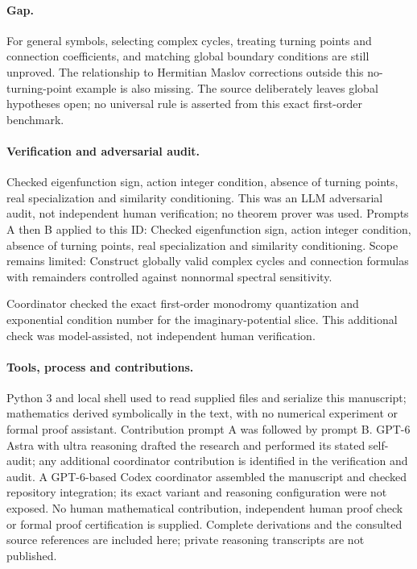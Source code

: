 \documentclass[11pt]{article}
\begin{document}
\paragraph{Gap.}For general symbols, selecting complex cycles, treating turning points and connection coefficients, and matching global boundary conditions are still unproved. The relationship to Hermitian Maslov corrections outside this no-turning-point example is also missing. The source deliberately leaves global hypotheses open; no universal rule is asserted from this exact first-order benchmark.

\paragraph{Verification and adversarial audit.}
Checked eigenfunction sign, action integer condition, absence of turning points, real specialization and similarity conditioning. This was an LLM adversarial audit, not independent human verification; no theorem prover was used. Prompts A then B applied to this ID: Checked eigenfunction sign, action integer condition, absence of turning points, real specialization and similarity conditioning. Scope remains limited: Construct globally valid complex cycles and connection formulas with remainders controlled against nonnormal spectral sensitivity.

Coordinator checked the exact first-order monodromy quantization and exponential condition number for the imaginary-potential slice. This additional check was model-assisted, not independent human verification.

\paragraph{Tools, process and contributions.}
Python 3 and local shell used to read supplied files and serialize this manuscript; mathematics derived symbolically in the text, with no numerical experiment or formal proof assistant. Contribution prompt A was followed by prompt B. GPT-6 Astra with ultra reasoning drafted the research and performed its stated self-audit; any additional coordinator contribution is identified in the verification and audit. A GPT-6-based Codex coordinator assembled the manuscript and checked repository integration; its exact variant and reasoning configuration were not exposed. No human mathematical contribution, independent human proof check or formal proof certification is supplied. Complete derivations and the consulted source references are included here; private reasoning transcripts are not published.
\end{document}
